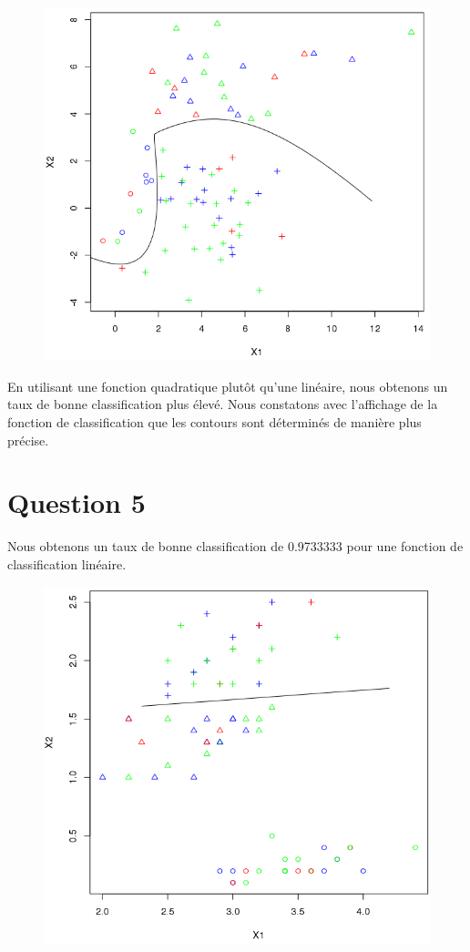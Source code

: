 \documentclass[a4paper,12pt]{report}
\begin{document}
\begin{figure}[!ht]
	\center
	\includegraphics[scale=0.5]{image/q4.png}
\end{figure}

En utilisant une fonction quadratique plutôt qu'une linéaire, nous obtenons un taux de bonne classification plus élevé. Nous constatons avec l'affichage de la fonction de classification que les contours sont déterminés de manière plus précise.
\newpage
\section*{Question 5}
Nous obtenons un taux de bonne classification de 0.9733333 pour une fonction de classification linéaire.
\begin{figure}[!ht]
	\center
	\includegraphics[scale=0.4]{image/q5_1.png}
\end{figure}
\end{document}
